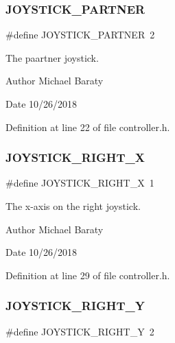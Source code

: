 \subsubsection{J\+O\+Y\+S\+T\+I\+C\+K\+\_\+\+P\+A\+R\+T\+N\+ER}
{\footnotesize\ttfamily \#define J\+O\+Y\+S\+T\+I\+C\+K\+\_\+\+P\+A\+R\+T\+N\+ER~2}



The paartner joystick. 

\begin{DoxyAuthor}{Author}
Michael Baraty 
\end{DoxyAuthor}
\begin{DoxyDate}{Date}
10/26/2018 
\end{DoxyDate}


Definition at line 22 of file controller.\+h.

\mbox{\label{controller_8h_a403e767d53da881973f4abbb1b55559b}} 
\subsubsection{J\+O\+Y\+S\+T\+I\+C\+K\+\_\+\+R\+I\+G\+H\+T\+\_\+X}
{\footnotesize\ttfamily \#define J\+O\+Y\+S\+T\+I\+C\+K\+\_\+\+R\+I\+G\+H\+T\+\_\+X~1}



The x-\/axis on the right joystick. 

\begin{DoxyAuthor}{Author}
Michael Baraty 
\end{DoxyAuthor}
\begin{DoxyDate}{Date}
10/26/2018 
\end{DoxyDate}


Definition at line 29 of file controller.\+h.

\mbox{\label{controller_8h_aaf742c9662e00d519092071167eb8c7a}} 
\subsubsection{J\+O\+Y\+S\+T\+I\+C\+K\+\_\+\+R\+I\+G\+H\+T\+\_\+Y}
{\footnotesize\ttfamily \#define J\+O\+Y\+S\+T\+I\+C\+K\+\_\+\+R\+I\+G\+H\+T\+\_\+Y~2}



